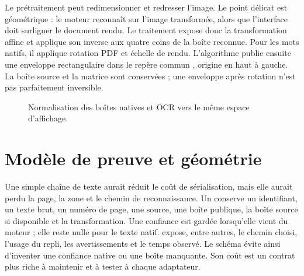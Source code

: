 Le prétraitement peut redimensionner et redresser l'image. Le point délicat est géométrique : le moteur reconnaît sur l'image transformée, alors que l'interface doit surligner le document rendu. Le traitement expose donc la transformation affine et applique son inverse aux quatre coins de la boîte reconnue. Pour les mots natifs, il applique rotation PDF et échelle de rendu. L'algorithme publie ensuite une enveloppe rectangulaire dans le repère commun \texttt{}, origine en haut à gauche. La boîte source et la matrice sont conservées ; une enveloppe après rotation n'est pas parfaitement inversible.

\begin{figure}[htbp]\centering
{}
\caption{Normalisation des boîtes natives et OCR vers le même espace d'affichage.}\label{fig:coordonnees}
\end{figure}

\section{Modèle de preuve et géométrie}
Une simple chaîne de texte aurait réduit le coût de sérialisation, mais elle aurait perdu la page, la zone et le chemin de reconnaissance. Un \texttt{} conserve un identifiant, un texte brut, un numéro de page, une source, une boîte publique, la boîte source si disponible et la transformation. Une confiance est gardée lorsqu'elle vient du moteur ; elle reste nulle pour le texte natif. \texttt{} expose, entre autres, le chemin choisi, l'usage du repli, les avertissements et le temps observé. Le schéma évite ainsi d'inventer une confiance native ou une boîte manquante. Son coût est un contrat plus riche à maintenir et à tester à chaque adaptateur.

